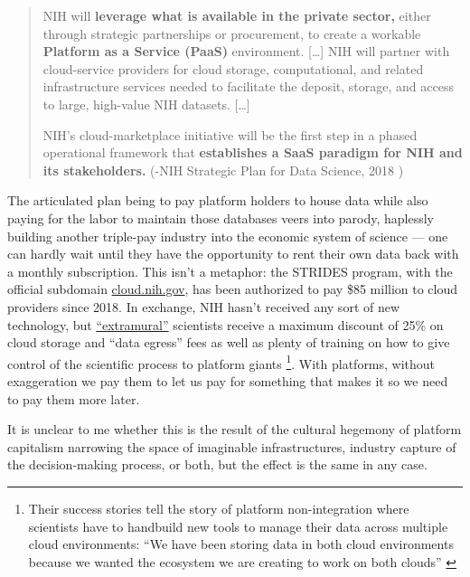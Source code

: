 \documentclass[10pt]{tufte-book}
\begin{document}
\begin{quote}
NIH will \textbf{leverage what is available in the private sector,}
either through strategic partnerships or procurement, to create a
workable \textbf{Platform as a Service (PaaS)} environment. {[}\ldots{]}
NIH will partner with cloud-service providers for cloud storage,
computational, and related infrastructure services needed to facilitate
the deposit, storage, and access to large, high-value NIH datasets.
{[}\ldots{]}

NIH's cloud-marketplace initiative will be the first step in a phased
operational framework that \textbf{establishes a SaaS paradigm for NIH
and its stakeholders.} (-NIH Strategic Plan for Data Science, 2018 \citep{NIHStrategicPlan2018} )
\end{quote}

The articulated plan being to pay platform holders to house data while
also paying for the labor to maintain those databases veers into parody,
haplessly building another triple-pay industry \citep{buranyiStaggeringlyProfitableBusiness2017}  into the economic system
of science --- one can hardly wait until they have the opportunity to
rent their own data back with a monthly subscription. This isn't a
metaphor: the STRIDES program, with the official subdomain
\href{https://web.archive.org/web/20210729131920/https://cloud.nih.gov/}{cloud.nih.gov},
has been authorized to pay \$85 million to cloud providers since 2018.
In exchange, NIH hasn't received any sort of new technology, but
\href{https://web.archive.org/web/20211006003547/https://cloud.nih.gov/enrollment/account-type/}{``extramural''}
scientists receive a maximum discount of 25\% on cloud storage and
``data egress'' fees as well as plenty of training on how to give
control of the scientific process to platform giants \citep{reillyNIHSTRIDESInitiative2021} \footnote{Their success stories tell
  the story of platform non-integration where scientists have to
  handbuild new tools to manage their data across multiple cloud
  environments: ``We have been storing data in both cloud environments
  because we wanted the ecosystem we are creating to work on both
  clouds'' \citep{STRIDESInitiativeSuccess2020} }. With platforms,
without exaggeration we pay them to let us pay for something that makes
it so we need to pay them more later.

It is unclear to me whether this is the result of the cultural hegemony
of platform capitalism narrowing the space of imaginable
infrastructures, industry capture of the decision-making process, or
both, but the effect is the same in any case.
\end{document}
